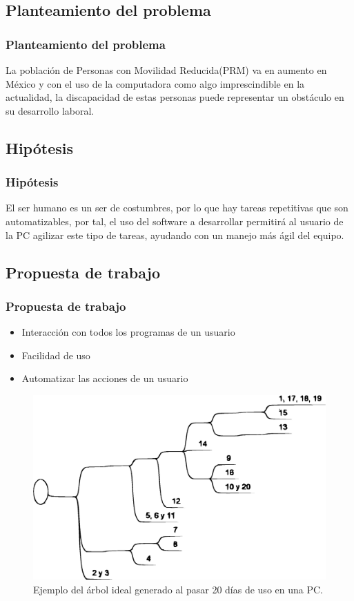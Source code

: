 \subsection{Planteamiento del problema}
\begin{frame}
\frametitle{Planteamiento del problema}

La poblaci\'on de Personas con Movilidad Reducida(PRM) va en aumento en 
 M\'exico  y con el uso de la computadora como algo imprescindible en la 
 actualidad, la discapacidad de estas personas puede representar un 
 obst\'aculo en su desarrollo laboral.

\end{frame}

\subsection{Hip\'otesis}
\begin{frame}
\frametitle{Hip\'otesis}

El ser humano es un ser de costumbres, por lo que hay tareas repetitivas
 que son automatizables, por tal, el uso del software a desarrollar
 permitir\'a al usuario de la PC agilizar este tipo de tareas, ayudando con 
 un manejo m\'as \'agil del equipo.

\end{frame}

\subsection{Propuesta de trabajo}
\begin{frame}
\frametitle{Propuesta de trabajo}

\footnotesize
\begin{itemize}
\item{Interacci\'on con todos los programas de un usuario}
\item{Facilidad de uso}
\item{Automatizar las acciones de un usuario}
\end{itemize}

\begin{figure}[h]
\centering
\includegraphics[width=0.6\columnwidth]{Imagenes/Arbol.eps}
\caption{\footnotesize Ejemplo del \'arbol ideal generado al pasar 20 d\'ias
 de uso en una PC.}
\label{fig:arbol}
\end{figure}

\end{frame}


